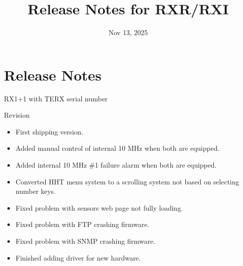 \documentclass[letterpaper,10pt,english]{sphinxhowto}
\title{Release Notes for RXR/RXI}
\date{Nov 13, 2025}
\author{}
\begin{document}
\pagestyle{empty}

\pagestyle{plain}

\pagestyle{normal}
\label{\detokenize{index::doc}}


\sphinxstepscope


\section{Release Notes}
\label{\detokenize{topics/release_notes:release-notes}}\label{\detokenize{topics/release_notes::doc}}
\sphinxAtStartPar
RX1+1 with TERX serial number

\sphinxAtStartPar
Revision
\begin{description}
\begin{itemize}
\item {} 
\sphinxAtStartPar
First shipping version.

\end{itemize}

\begin{itemize}
\item {} 
\sphinxAtStartPar
Added manual control of internal 10 MHz when both are equipped.

\item {} 
\sphinxAtStartPar
Added internal 10 MHz \#1 failure alarm when both are equipped.

\item {} 
\sphinxAtStartPar
Converted HHT menu system to a scrolling system not based on selecting number keys.

\end{itemize}

\begin{itemize}
\item {} 
\sphinxAtStartPar
Fixed problem with sensors web page not fully loading.

\end{itemize}

\begin{itemize}
\item {} 
\sphinxAtStartPar
Fixed problem with FTP crashing firmware.

\item {} 
\sphinxAtStartPar
Fixed problem with SNMP crashing firmware.

\end{itemize}

\begin{itemize}
\item {} 
\sphinxAtStartPar
Finished adding driver for new hardware.


\end{itemize}
\end{description}
\end{document}

